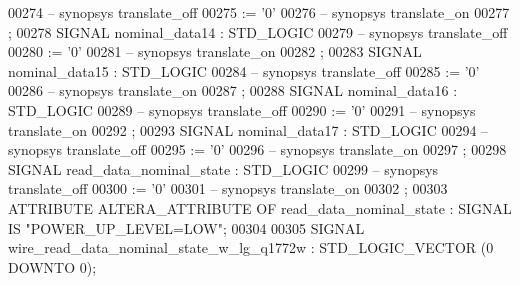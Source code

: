 \begin{DoxyCode}
{00274 \textcolor{keyword}{     -- synopsys translate\_off}
00275       \textcolor{vhdlchar}{:=} \textcolor{vhdlchar}{'}\textcolor{vhdllogic}{}\textcolor{vhdllogic}{0}\textcolor{vhdlchar}{'}
00276 \textcolor{keyword}{     -- synopsys translate\_on}
00277      ;
00278      \textcolor{keywordflow}{SIGNAL}  \textcolor{vhdlchar}{nominal_data14} \textcolor{vhdlchar}{:}   \textcolor{comment}{STD\_LOGIC}
00279 \textcolor{keyword}{     -- synopsys translate\_off}
00280       \textcolor{vhdlchar}{:=} \textcolor{vhdlchar}{'}\textcolor{vhdllogic}{}\textcolor{vhdllogic}{0}\textcolor{vhdlchar}{'}
00281 \textcolor{keyword}{     -- synopsys translate\_on}
00282      ;
00283      \textcolor{keywordflow}{SIGNAL}  \textcolor{vhdlchar}{nominal_data15} \textcolor{vhdlchar}{:}   \textcolor{comment}{STD\_LOGIC}
00284 \textcolor{keyword}{     -- synopsys translate\_off}
00285       \textcolor{vhdlchar}{:=} \textcolor{vhdlchar}{'}\textcolor{vhdllogic}{}\textcolor{vhdllogic}{0}\textcolor{vhdlchar}{'}
00286 \textcolor{keyword}{     -- synopsys translate\_on}
00287      ;
00288      \textcolor{keywordflow}{SIGNAL}  \textcolor{vhdlchar}{nominal_data16} \textcolor{vhdlchar}{:}   \textcolor{comment}{STD\_LOGIC}
00289 \textcolor{keyword}{     -- synopsys translate\_off}
00290       \textcolor{vhdlchar}{:=} \textcolor{vhdlchar}{'}\textcolor{vhdllogic}{}\textcolor{vhdllogic}{0}\textcolor{vhdlchar}{'}
00291 \textcolor{keyword}{     -- synopsys translate\_on}
00292      ;
00293      \textcolor{keywordflow}{SIGNAL}  \textcolor{vhdlchar}{nominal_data17} \textcolor{vhdlchar}{:}   \textcolor{comment}{STD\_LOGIC}
00294 \textcolor{keyword}{     -- synopsys translate\_off}
00295       \textcolor{vhdlchar}{:=} \textcolor{vhdlchar}{'}\textcolor{vhdllogic}{}\textcolor{vhdllogic}{0}\textcolor{vhdlchar}{'}
00296 \textcolor{keyword}{     -- synopsys translate\_on}
00297      ;
00298      \textcolor{keywordflow}{SIGNAL}  \textcolor{vhdlchar}{read_data_nominal_state}    \textcolor{vhdlchar}{:}   \textcolor{comment}{STD\_LOGIC}
00299 \textcolor{keyword}{     -- synopsys translate\_off}
00300       \textcolor{vhdlchar}{:=} \textcolor{vhdlchar}{'}\textcolor{vhdllogic}{}\textcolor{vhdllogic}{0}\textcolor{vhdlchar}{'}
00301 \textcolor{keyword}{     -- synopsys translate\_on}
00302      ;
00303      \textcolor{keywordflow}{ATTRIBUTE} \textcolor{vhdlchar}{ALTERA_ATTRIBUTE} \textcolor{keywordflow}{OF} \textcolor{vhdlchar}{read_data_nominal_state} \textcolor{vhdlchar}{:} \textcolor{keywordflow}{SIGNAL} \textcolor{keywordflow}{IS} \textcolor{keyword}{"POWER\_UP\_LEVEL=LOW"};
00304 
00305      \textcolor{keywordflow}{SIGNAL}  \textcolor{vhdlchar}{wire_read_data_nominal_state_w_lg_q1772w}   \textcolor{vhdlchar}{:}   \textcolor{comment}{STD\_LOGIC\_VECTOR} \textcolor{vhdlchar}{(}\textcolor{vhdllogic}{}\textcolor{vhdllogic}{0} \textcolor{keywordflow}{DOWNTO} \textcolor{vhdllogic}{}\textcolor{vhdllogic}{0}\textcolor{vhdlchar}{)};
}
\end{DoxyCode}
